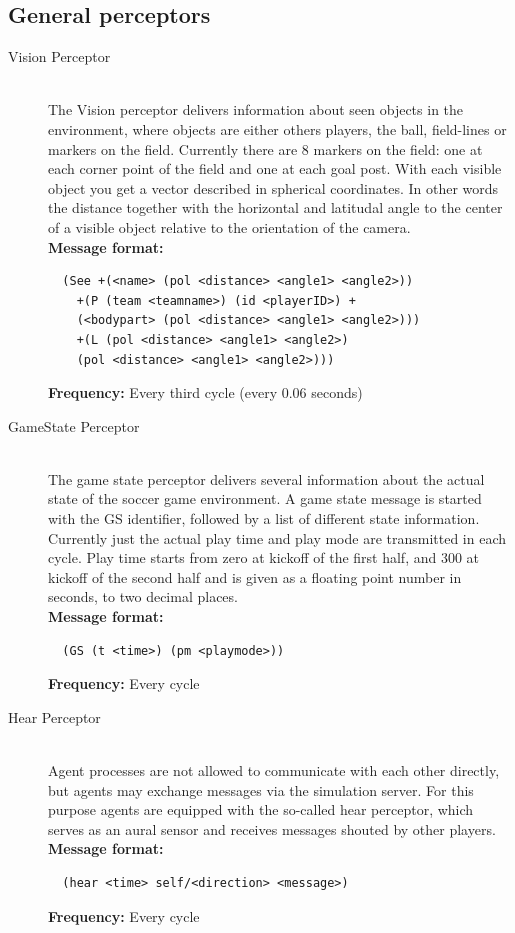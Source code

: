 \subsection{General perceptors}
\begin{description}
  \item [Vision Perceptor] \hfill \\
  The Vision perceptor delivers information about seen objects in the environment, where objects are either others players, the ball, field-lines or markers on the field. Currently there are 8 markers on the field: one at each corner point of the field and one at each goal post. With each visible object you get a vector described in spherical coordinates. In other words the distance together with the horizontal and latitudal angle to the center of a visible object relative to the orientation of the camera.
  \hfill \\
{ \bf Message format:}
  \begin{verbatim}
  (See +(<name> (pol <distance> <angle1> <angle2>))
    +(P (team <teamname>) (id <playerID>) +
    (<bodypart> (pol <distance> <angle1> <angle2>)))
    +(L (pol <distance> <angle1> <angle2>) 
    (pol <distance> <angle1> <angle2>)))
  \end{verbatim}
   { \bf Frequency:}
	Every third cycle (every 0.06 seconds)\\
  \item [GameState Perceptor] \hfill \\
  The game state perceptor delivers several information about the actual state of the soccer game environment. A game state message is started with the GS identifier, followed by a list of different state information. Currently just the actual play time and play mode are transmitted in each cycle. Play time starts from zero at kickoff of the first half, and 300 at kickoff of the second half and is given as a floating point number in seconds, to two decimal places.
    \hfill \\
{ \bf Message format:}
  \begin{verbatim}
  (GS (t <time>) (pm <playmode>))
  \end{verbatim}
   { \bf Frequency:}
	Every cycle\\
  \item [Hear Perceptor] \hfill \\ 
  Agent processes are not allowed to communicate with each other directly, but agents may exchange messages via the simulation server. For this purpose agents are equipped with the so-called hear perceptor, which serves as an aural sensor and receives messages shouted by other players. 
    \hfill \\
{ \bf Message format:}
  \begin{verbatim}
  (hear <time> self/<direction> <message>)
  \end{verbatim}
   { \bf Frequency:}
	Every cycle\\
\end{description}
